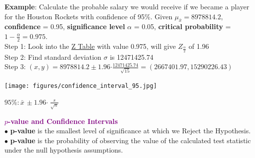 \documentclass[letterpaper, 10.5pt,landscape]{article}
\begin{document}
\begin{multicols*}{3}
\textbf{Example}: Calculate the probable salary we would receive if we became a player for the Houston Rockets with confidence of 95\%. Given $\mu_{\bar{x}} = 8978814.2$, \textbf{confidence} = 0.95, \textbf{significance level} $\alpha$ = 0.05, \textbf{critical probability} = \(1-\frac{\alpha}{2} = 0.975\). \\
Step 1: Look into the \href{https://z-table.com/}{Z Table} with value 0.975, will give \(Z_{\frac{\alpha}{2}}\) of 1.96\\
Step 2: Find standard deviation $\sigma$ is 12471425.74 \\
Step 3: \((x,y) =  8978814.2 \pm 1.96  \boldsymbol{\cdot} \frac{12471425.74}{\sqrt{15}} = (2667401.97, 15290226.43)\)


\vspace{-4pt}
\begin{center}
    \begin{minipage}{0.66\linewidth}
    \texttt{[image: figures/confidence\_interval\_95.jpg]}
    \end{minipage}
\end{center}
\vspace{-4pt}


\(\boxed{95 \% : \bar{x} \, \pm 1.96 \boldsymbol{\cdot} \hspace{3pt}\frac{s}{\sqrt{n}}} \) 





\vspace{3pt}


\vspace{3pt}
\textcolor{purple}{\textbf{\textbf{$p$-value and Confidence Intervals}}} \\

$\bullet$ \textbf{p-value} is the smallest level of significance at which we Reject the Hypothesis. \\


$\bullet$ \textbf{p-value} is the probability of observing the value of the calculated test statistic under the null hypothesis assumptions. \\


\end{multicols*}
\end{document}
